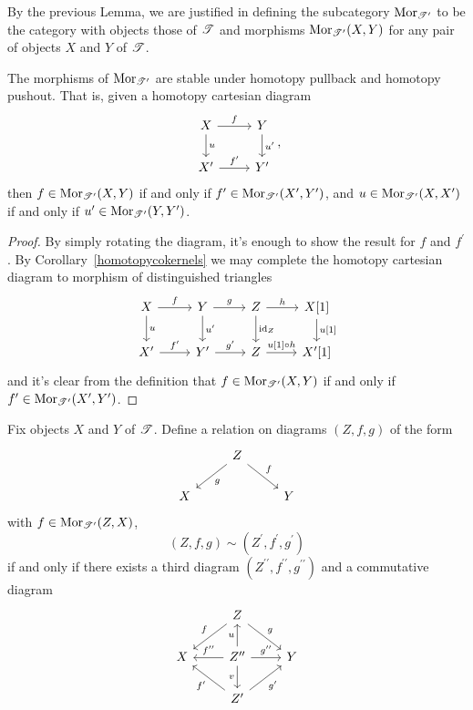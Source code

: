 \documentclass[dissertation.tex]{subfiles}
\begin{document}
\begin{defn}
  By the previous Lemma, we are justified in defining the subcategory $\operatorname{Mor}_{\mathscr{T}^\prime}$ to be the category with objects those of $\mathscr{T}$ and morphisms $\operatorname{Mor}_{\mathscr{T}^\prime}(X,Y)$ for any pair of objects $X$ and $Y$ of $\mathscr{T}$.
\end{defn}

\begin{prop}[\cite{NeemanTCats}]
  The morphisms of $\operatorname{Mor}_{\mathscr{T}^\prime}$ are stable under homotopy pullback and homotopy pushout.
  That is, given a homotopy cartesian diagram
  $$\begin{tikzcd}
    X \arrow{r}{f}\arrow{d}{u} & Y \arrow{d}{u^\prime}\\
    X^\prime \arrow{r}{f^\prime} & Y^\prime
  \end{tikzcd},$$
  then 
  $f \in \operatorname{Mor}_{\mathscr{T}^\prime}(X,Y)$ 
  if and only if 
  $f^\prime \in \operatorname{Mor}_{\mathscr{T}^\prime}(X^\prime, Y^\prime)$, and
  $u \in \operatorname{Mor}_{\mathscr{T}^\prime}(X,X^\prime)$ 
  if and only if
  $u^\prime \in \operatorname{Mor}_{\mathscr{T}^\prime}(Y,Y^\prime)$.
  
  \begin{proof}
    By simply rotating the diagram, it's enough to show the result for $f$ and $f^\prime$.
    By Corollary~\ref{homotopycokernels} we may complete the homotopy cartesian diagram to morphism of distinguished triangles
    $$\begin{tikzcd}
      X \arrow{r}{f}\arrow{d}{u} & Y \arrow{r}{g}\arrow{d}{u^\prime} & Z \arrow{r}{h}\arrow{d}{\id_Z} & X[1]\arrow{d}{u[1]}\\
      X^\prime \arrow{r}{f^\prime} & Y^\prime \arrow{r}{g^\prime} & Z \arrow{r}{u[1] \circ h} & X^\prime[1]
    \end{tikzcd}$$
    and it's clear from the definition that $f \in \operatorname{Mor}_{\mathscr{T}^\prime}(X,Y)$ if and only if $f^\prime \in \operatorname{Mor}_{\mathscr{T}^\prime}(X^\prime, Y^\prime)$.
  \end{proof}
\end{prop}

\begin{defn}[\cite{NeemanTCats}]
  Fix objects $X$ and $Y$ of $\mathscr{T}$.
  Define a relation on diagrams $(Z,f,g)$ of the form 
  $$\begin{tikzcd}
    & Z\arrow{rd}{f}\arrow{ld}{g}\\
    X & & Y
  \end{tikzcd}$$
  with $f \in \operatorname{Mor}_{\mathscr{T}^\prime}(Z,X)$,
  $$(Z,f,g) \sim (Z^\prime, f^\prime, g^\prime)$$
  if and only if there exists a third diagram $(Z^{\prime\prime}, f^{\prime\prime}, g^{\prime\prime})$ and a commutative diagram
  $$\begin{tikzcd}
    & Z\arrow[swap]{ld}{f}\arrow{rd}{g}\\
    X & Z^{\prime\prime} \arrow[swap]{l}{f^{\prime\prime}}\arrow{r}{g^{\prime\prime}}\arrow{u}{u}\arrow[swap]{d}{v} & Y\\
    & Z^\prime\arrow{ul}{f^\prime}\arrow[swap]{ur}{g^\prime}
  \end{tikzcd}$$
\end{defn}
\end{document}
